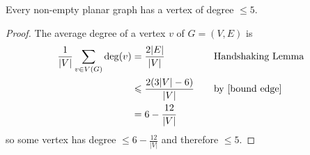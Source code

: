 \begin{thmbox}
    \begin{lemma}
        Every non-empty planar graph has a vertex of degree $ \leqslant 5 $.
    \end{lemma}
\end{thmbox}
\begin{proof}
    The average degree of a vertex $ v $ of $ G=(V,E) $ is
    \begin{equation*}
        \begin{aligned}
            \frac{1}{|V|} \sum\limits_{v\in V(G)}\deg(v)
             & =\frac{2|E|}{|V|}               & \quad & \text{Handshaking Lemma}   \\
             & \leqslant \frac{2(3|V|-6)}{|V|} & \quad & \text{by~\ref{bound edge}} \\
             & =6-\frac{12}{|V|}
        \end{aligned}
    \end{equation*}
    so some vertex has degree $ \leqslant 6-\frac{12}{|V|} $ and therefore
    $ \leqslant 5 $.
\end{proof}

